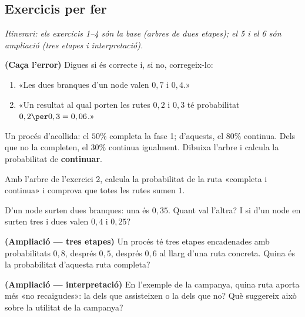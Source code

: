 \subsection{Exercicis per fer}

\noindent\textit{Itinerari: els exercicis 1–4 són la base (arbres de dues etapes); el 5
i el 6 són ampliació (tres etapes i interpretació).}

\begin{exercicis}
\begin{exlist}
  \item \textbf{(Caça l'error)} Digues si és correcte i, si no, corregeix-lo:
    \begin{enumerate}[label=\alph*), leftmargin=1.6em, topsep=2pt]
      \item «Les dues branques d'un node valen $0,7$ i $0,4$.»
      \item «Un resultat al qual porten les rutes $0,2$ i $0,3$ té probabilitat
            $0,2\per 0,3=0,06$.»
    \end{enumerate}
  \item Un procés d'acollida: el $50\%$ completa la fase 1; d'aquests, el $80\%$
        continua. Dels que no la completen, el $30\%$ continua igualment. Dibuixa
        l'arbre i calcula la probabilitat de \textbf{continuar}.
  \item Amb l'arbre de l'exercici 2, calcula la probabilitat de la ruta «completa i
        continua» i comprova que totes les rutes sumen $1$.
  \item D'un node surten dues branques: una és $0,35$. Quant val l'altra? I si d'un node
        en surten tres i dues valen $0,4$ i $0,25$?
  \item \textbf{(Ampliació — tres etapes)} Un procés té tres etapes encadenades amb
        probabilitats $0,8$, després $0,5$, després $0,6$ al llarg d'una ruta concreta.
        Quina és la probabilitat d'aquesta ruta completa?
  \item \textbf{(Ampliació — interpretació)} En l'exemple de la campanya, quina ruta
        aporta més «no recaigudes»: la dels que assisteixen o la dels que no? Què
        suggereix això sobre la utilitat de la campanya?
\end{exlist}
\end{exercicis}

